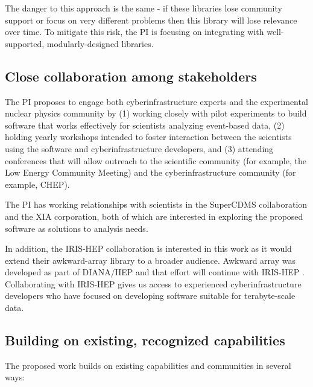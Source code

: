 The danger to this approach is the same - if these libraries lose community support or focus on very different problems then this library will lose relevance over time.  To mitigate this risk, the PI is focusing on integrating with well-supported, modularly-designed libraries.

\subsection{Close collaboration among stakeholders}

The PI proposes to engage both cyberinfrastructure experts and the experimental nuclear physics community by (1) working closely with pilot experiments to build software that works effectively for scientists analyzing event-based data, (2) holding yearly workshops intended to foster interaction between the scientists using the software and cyberinfrastructure developers, and (3) attending conferences that will allow outreach to the scientific community (for example, the Low Energy Community Meeting) and the cyberinfrastructure community (for example, CHEP).

The PI has working relationships with scientists in the SuperCDMS collaboration and the XIA corporation, both of which are interested in exploring the proposed software as solutions to analysis needs.

In addition, the IRIS-HEP collaboration is interested in this work as it would extend their awkward-array library to a broader audience.  Awkward array was developed as part of DIANA/HEP \cite{diana-hep} and that effort will continue with IRIS-HEP \cite{iris-hep}
.  Collaborating with IRIS-HEP gives us access to experienced cyberinfrastructure developers who have focused on developing software suitable for terabyte-scale data.


\subsection{Building on existing, recognized capabilities}

The proposed work builds on existing capabilities and communities in several ways:

